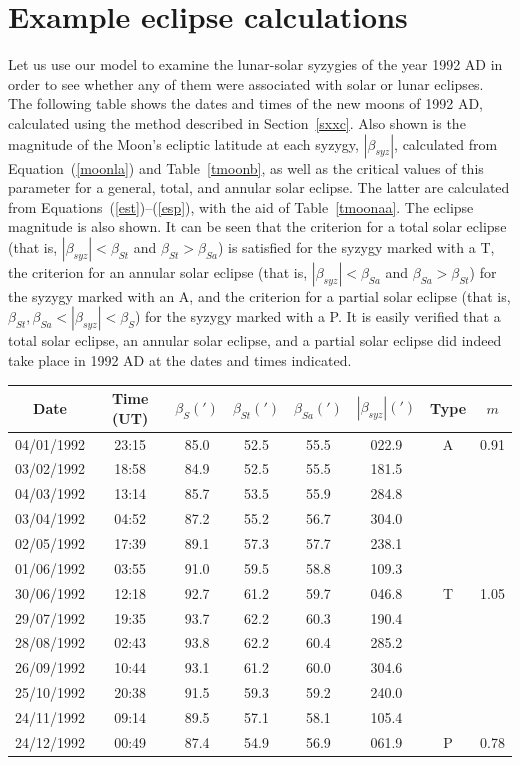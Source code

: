 \section{Example eclipse calculations}
Let us use our model to examine the lunar-solar syzygies of the year
1992 AD in order to see whether any of them were associated with solar or
lunar eclipses. The following  table  shows the dates and times of the new moons
of 1992 AD, calculated using the method described in Section~\ref{sxxc}. Also shown is the magnitude of the Moon's ecliptic latitude
at each syzygy, $|\beta_{syz}|$, calculated from 
Equation~(\ref{moonla}) and Table~\ref{tmoonb}, as well as the critical values of
this parameter for a general,  total, and annular solar eclipse. The latter are calculated from
Equations~(\ref{est})--(\ref{esp}), with the aid of Table~\ref{tmoonaa}.  The eclipse magnitude is also shown. It can be seen that
the criterion for a total solar eclipse (that is, $|\beta_{syz}|< \beta_{St}$ and $\beta_{St}>\beta_{Sa}$) is satisfied for the syzygy marked with a T,  the criterion for an annular solar eclipse (that is, $|\beta_{syz}|< \beta_{Sa}$ and $\beta_{Sa}>\beta_{St}$) for the syzygy marked with an A,
and
the criterion for a partial solar eclipse  (that is, $\beta_{St},\beta_{Sa}<|\beta_{syz}|< \beta_{S}$)  for the syzygy marked with a P. It is easily verified
that a total solar eclipse, an annular solar eclipse, and a partial solar eclipse did indeed
take place in 1992 AD at the dates and times indicated.

\begin{center}
\begin{tabular}{cccccccc}
Date & Time (UT) & $\beta_{S}(')$ & $\beta_{St}(')$ & $\beta_{Sa}(')$ & $|\beta_{syz}|(')$ & Type & $m$\\\hline
04/01/1992 &  23:15 & 85.0 & 52.5 & 55.5 & 022.9 & A & 0.91\\
03/02/1992 &  18:58 & 84.9 & 52.5 & 55.5 & 181.5 &   &\\
04/03/1992 &  13:14 & 85.7 & 53.5 & 55.9 & 284.8 &   &\\
03/04/1992 &  04:52 & 87.2 & 55.2 & 56.7 & 304.0 &   &\\
02/05/1992 &  17:39 & 89.1 & 57.3 & 57.7 & 238.1 &   &\\
01/06/1992 &  03:55 & 91.0 & 59.5 & 58.8 & 109.3 &   &\\
30/06/1992 &  12:18 & 92.7 & 61.2 & 59.7 & 046.8 & T & 1.05\\
29/07/1992 &  19:35 & 93.7 & 62.2 & 60.3 & 190.4 &   &\\
28/08/1992 &  02:43 & 93.8 & 62.2 & 60.4 & 285.2 &   &\\
26/09/1992 &  10:44 & 93.1 & 61.2 & 60.0 & 304.6 &   &\\
25/10/1992 &  20:38 & 91.5 & 59.3 & 59.2 & 240.0 &   &\\
24/11/1992 &  09:14 & 89.5 & 57.1 & 58.1 & 105.4 &   &\\
24/12/1992 &  00:49 & 87.4 & 54.9 & 56.9 & 061.9 & P & 0.78\\
\end{tabular}
\end{center}

